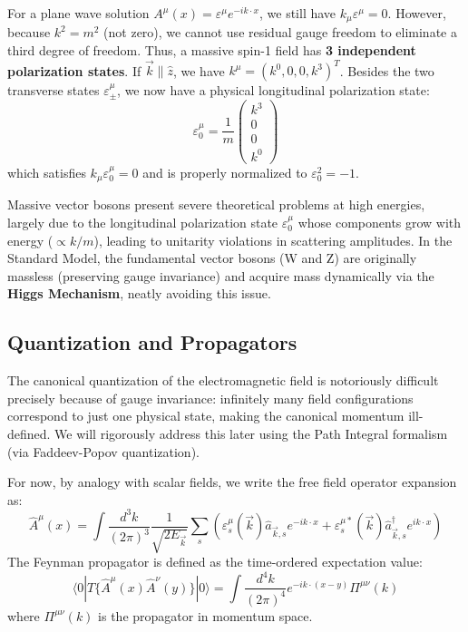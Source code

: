 For a plane wave solution \(A^\mu(x) = \varepsilon^\mu e^{-i k \cdot x}\), we still have \(k_\mu \varepsilon^\mu = 0\). However, because \(k^2 = m^2\) (not zero), we cannot use residual gauge freedom to eliminate a third degree of freedom. Thus, a massive spin-1 field has \textbf{3 independent polarization states}.
If \(\vec{k} \parallel \hat{z}\), we have \(k^\mu = (k^0, 0, 0, k^3)^T\). Besides the two transverse states \(\varepsilon^\mu_\pm\), we now have a physical longitudinal polarization state:
\[
    \varepsilon^\mu_0 = \frac{1}{m} \begin{pmatrix} k^3 \\ 0 \\ 0 \\ k^0 \end{pmatrix}
\]
which satisfies \(k_\mu \varepsilon^\mu_0 = 0\) and is properly normalized to \(\varepsilon_0^2 = -1\).

\begin{remark}
    Massive vector bosons present severe theoretical problems at high energies, largely due to the longitudinal polarization state \(\varepsilon^\mu_0\) whose components grow with energy (\(\propto k/m\)), leading to unitarity violations in scattering amplitudes. In the Standard Model, the fundamental vector bosons (W and Z) are originally massless (preserving gauge invariance) and acquire mass dynamically via the \textbf{Higgs Mechanism}, neatly avoiding this issue.
\end{remark}

\subsection{Quantization and Propagators}

The canonical quantization of the electromagnetic field is notoriously difficult precisely because of gauge invariance: infinitely many field configurations correspond to just one physical state, making the canonical momentum ill-defined. We will rigorously address this later using the Path Integral formalism (via Faddeev-Popov quantization).

For now, by analogy with scalar fields, we write the free field operator expansion as:
\[
    \hat{A}^\mu(x) = \int \frac{d^3k}{(2\pi)^3} \frac{1}{\sqrt{2E_{\vec{k}}}} \sum_s \left( \varepsilon^\mu_s(\vec{k}) \hat{a}_{\vec{k},s} e^{-i k \cdot x} + \varepsilon^{\mu *}_s(\vec{k}) \hat{a}^\dagger_{\vec{k},s} e^{i k \cdot x} \right)
\]
The Feynman propagator is defined as the time-ordered expectation value:
\[
    \langle 0 | T \{ \hat{A}^\mu(x) \hat{A}^\nu(y) \} | 0 \rangle = \int \frac{d^4k}{(2\pi)^4} e^{-i k \cdot (x-y)} \Pi^{\mu\nu}(k)
\]
where \(\Pi^{\mu\nu}(k)\) is the propagator in momentum space.

